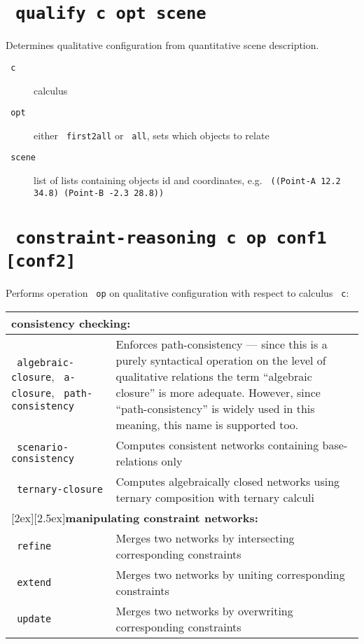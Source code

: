 \documentclass[headsepline]{scrreprt}
\theoremstyle{definition}
\begin{document}
\section*{\texttt{ qualify c opt scene}}
Determines qualitative configuration from quantitative scene description.
	\begin{description}
		\item[\texttt{ c}] calculus
		\item[\texttt{ opt}] either \texttt{ first2all} or \texttt{ all}, sets which objects to relate
		\item[\texttt{ scene}] list of lists containing objects id and coordinates, e.g. \texttt{ ((Point-A 12.2 34.8) (Point-B -2.3 28.8))}
	\end{description}

\section*{\texttt{ constraint-reasoning c op conf1 [conf2]}}

Performs operation \texttt{ op} on qualitative configuration with respect to calculus \texttt{ c}:
\begin{longtable}{|p{4.5cm}|p{9cm}|}
\hline
\multicolumn{2}{|l|}{\bfseries consistency checking:}\\ \hline
\texttt{ algebraic-closure}, \texttt{ a-closure}, \texttt{ path-consistency}  & Enforces path-consistency --- since this is a purely syntactical operation on the
					level of qualitative relations the term ``algebraic closure'' is more adequate.
					However, since ``path-consistency'' is widely used in this meaning, this name is
					supported too.\\
\texttt{ scenario-consistency} & Computes consistent networks containing base-relations only\\[0,5ex]
\texttt{ ternary-closure} & Computes algebraically closed networks using ternary composition with ternary calculi\\[1,0ex]
\hline
\multicolumn{2}{|l|}{\raisebox{-2ex}[2ex][2.5ex]{{\bfseries manipulating constraint networks:}}}\\ \hline
\texttt{ refine} & Merges two networks by intersecting corresponding constraints\\
\texttt{ extend} & Merges two networks by uniting corresponding constraints\\
\texttt{ update} & Merges two networks by overwriting corresponding constraints\\ \hline
\end{longtable}
\end{document}
